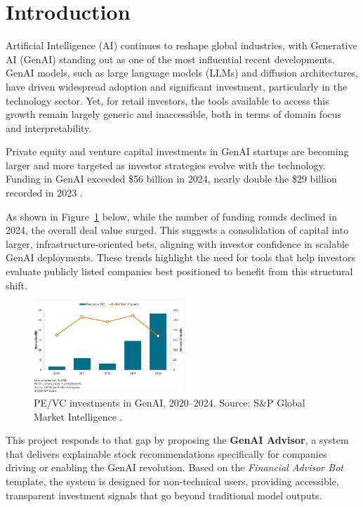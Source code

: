 \section{Introduction}

Artificial Intelligence (AI) continues to reshape global industries, with Generative AI (GenAI) standing out as one of the most influential recent developments. GenAI models, such as large language models (LLMs) and diffusion architectures, have driven widespread adoption and significant investment, particularly in the technology sector. Yet, for retail investors, the tools available to access this growth remain largely generic and inaccessible, both in terms of domain focus and interpretability.

Private equity and venture capital investments in GenAI startups are becoming larger and more targeted as investor strategies evolve with the technology. Funding in GenAI exceeded \$56 billion in 2024, nearly double the \$29 billion recorded in 2023 \cite{spglobal2025}.

As shown in Figure~\ref{fig:genai-investment} below, while the number of funding rounds declined in 2024, the overall deal value surged. This suggests a consolidation of capital into larger, infrastructure-oriented bets, aligning with investor confidence in scalable GenAI deployments. These trends highlight the need for tools that help investors evaluate publicly listed companies best positioned to benefit from this structural shift.

\begin{figure}[h]
    \centering
    \includegraphics[width=0.5\textwidth]{assets/investGenAI.png}
    \caption{\small PE/VC investments in GenAI, 2020–2024. Source: S\&P Global Market Intelligence \cite{spglobal2025}.}
    \label{fig:genai-investment}
\end{figure}

This project responds to that gap by proposing the \textbf{GenAI Advisor}, a system that delivers explainable stock recommendations specifically for companies driving or enabling the GenAI revolution. Based on the \textit{Financial Advisor Bot} template, the system is designed for non-technical users, providing accessible, transparent investment signals that go beyond traditional model outputs.

